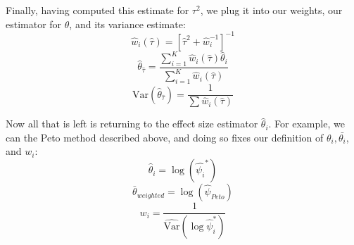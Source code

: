 \documentclass[fleqn,10pt]{SelfArx} %
\begin{document}
Finally, having computed this estimate for $\tau^2$, we plug it into our weights, our estimator for $\theta$, and its variance estimate:
\[\hat{w}_i({\hat{\tau}}) = [\hat{\tau}^2 + \hat{w}_i^{-1}]^{-1}\]
\[\hat{\theta}_{\hat{\tau}} =  \frac{\sum_{i = 1}^K \hat{w}_i(\hat{\tau})  \hat{\theta}_i }{\sum_{i = 1}^K \hat{w}_i(\hat{\tau})}\]
\[\textrm{Var}(\hat{\theta}_{\hat{\tau}}) = \frac{1}{\sum\hat{w}_i(\hat{\tau})}\]

Now all that is left is returning to the effect size estimator $\hat{\theta}_i$. For example, we can the Peto method described above, and doing so fixes our definition of $\theta_i, \bar{\theta_i}$, and $w_i$\cite{Methods}:
\[\hat{\theta}_i = \log (\hat{\psi_i}^*)\]
\[\bar{\theta}_{weighted} = \log(\hat{\psi}_{Peto})\]
\[w_i = \frac{1}{\widehat{\textrm{Var}}(\log \hat{\psi}_i^*)}\]

\end{document}
